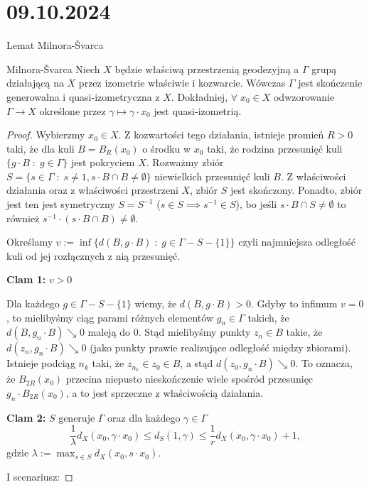\section{09.10.2024}{Lemat Milnora-\v{S}varca}

\begin{lemma}{Milnora-\v{S}varca}{}
  Niech $X$ będzie właściwą przestrzenią geodezyjną a $\Gamma$ grupą działającą na $X$ przez izometrie właściwie i kozwarcie. Wówczas $\Gamma$ jest skończenie generowalna i quasi-izometryczna z $X$. Dokładniej, $\forall\;x_0\in X$ odwzorowanie $\Gamma\to X$ określone przez $\gamma\mapsto \gamma\cdot x_0$ jest quasi-izometrią.
\end{lemma}

\begin{proof}
  Wybierzmy $x_0\in X$. Z kozwartości tego działania, istnieje promień $R>0$ taki, że dla kuli $B=B_R(x_0)$ o środku w $x_0$ taki, że rodzina przesunięć kuli $\{g\cdot B\;:\; g\in\Gamma\}$ jest pokryciem $X$. Rozważmy zbiór $S=\{s\in\Gamma\;:\;s\neq1,s\cdot B\cap B\neq \emptyset\}$ niewielkich przesunięć kuli $B$. Z właściwości działania oraz z właściwości przestrzeni $X$, zbiór $S$ jest skończony. Ponadto, zbiór jest ten jest symetryczny $S=S^{-1}$ ($s\in S\implies s^{-1}\in S$), bo jeśli $s\cdot B\cap S\neq \emptyset$ to również $s^{-1}\cdot (s\cdot B\cap B)\neq \emptyset$.

  Określamy $v:=\inf\{d(B, g\cdot B)\;:\;g\in \Gamma-S-\{1\}\}$ czyli najmniejsza odległość kuli od jej rozłącznych z nią przesunięć.

  \textbf{Clam 1:} $v>0$

  Dla każdego $g\in\Gamma-S-\{1\}$ wiemy, że $d(B, g\cdot B)>0$. Gdyby to infimum $v=0$, to mielibyśmy ciąg parami różnych elementów $g_n\in\Gamma$ takich, że $d(B, g_n\cdot B)\searrow 0$ maleją do $0$. Stąd mielibyśmy punkty $z_n\in B$ takie, że $d(z_n, g_n\cdot B)\searrow 0$ (jako punkty prawie realizujące odległość między zbiorami). Istnieje podciąg $n_k$ taki, że $z_{n_k}\in z_0\in B$, a stąd $d(z_0, g_n\cdot B)\searrow 0$. To oznacza, że $B_{2R}(x_0)$ przecina niepusto nieskończenie wiele spośród przesunięc $g_n\cdot B_{2R}(x_0)$, a to jest sprzeczne z właściwością działania.

  \textbf{Clam 2:} $S$ generuje $\Gamma$ oraz dla każdego $\gamma\in\Gamma$
  $$\frac{1}{\lambda}d_X(x_0, \gamma\cdot x_0)\leq d_S(1, \gamma)\leq\frac{1}{r}d_X(x_0,\gamma\cdot x_0)+1,$$
  gdzie $\lambda:=\max_{s\in S}d_X(x_0, s\cdot x_0)$.

  I scenariusz:


\end{proof}
